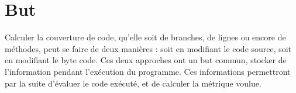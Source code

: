 \section{But}
\label{sec:but}

Calculer la couverture de code, qu'elle soit de branches, de lignes ou encore de méthodes, peut se faire de deux manières\cite{baxter} : soit en modifiant le code source, soit en modifiant le byte code. Ces deux approches ont un but commun, stocker de l’information pendant l’exécution du programme. Ces informations permettront par la suite d’évaluer le code exécuté, et de calculer la métrique voulue.
